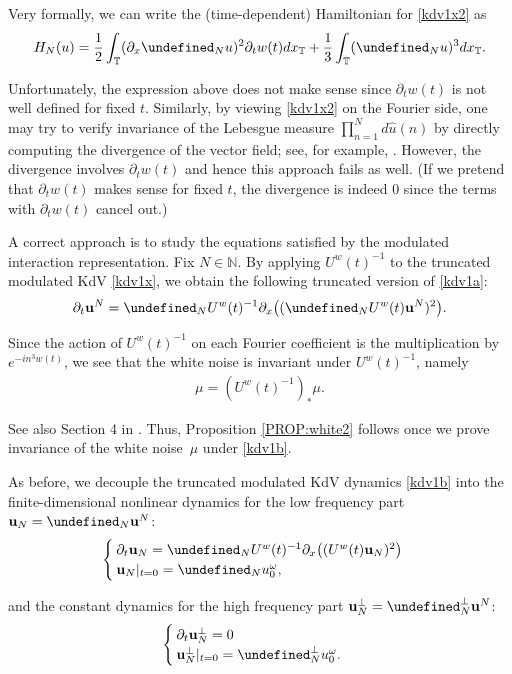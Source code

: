 \documentclass[letterpaper, 11pt,  reqno]{amsart}
\newcommand{\1}{\hspace{0.5mm}\text{I}\hspace{0.5mm}}
\newcommand{\noi}{\noindent}
\newcommand{\T}{\mathbb{T}}
\let\P= \undefined
\newcommand{\P}{\mathbf{P}}
\newcommand{\ft}{\widehat}
\newcommand{\dx}{\partial_x}
\newcommand{\dt}{\partial_t}
\renewcommand{\o}{\omega}
\newcommand{\N}{\mathbb{N}}
\newcommand{\uw}{U^w}
\newcommand{\uu}{\mathbf{u}}
\numberwithin{equation}{section}
\numberwithin{theorem}{section}
\begin{document}
Very formally, we can write the (time-dependent) Hamiltonian for \eqref{kdv1x2}
as 
\begin{align*}
H_N(u) = \frac 12 \int_\T (\dx \P_N u)^2\dt w (t) dx_\T
+ \frac 13 \int_\T (\P_N u)^3dx_\T.
\end{align*}

\noi
Unfortunately, the expression above does not make sense
since $\dt w (t)$ is not well defined for fixed $t$. 
Similarly, by viewing \eqref{kdv1x2} on the Fourier side, 
one may try to verify invariance of the Lebesgue measure
$\prod_{n = 1}^N d\ft u(n)$ by directly computing
the divergence of the vector field; see, for example, 
\cite[Lemma 4.1]{NORS}.
However, the divergence involves $\dt w(t)$
and hence this approach fails as well.
(If we pretend that $\dt w(t)$ makes sense for fixed $t$, 
the divergence is indeed $0$ since the terms
with $\dt w(t)$ cancel out.)


A correct approach is to study the equations satisfied
by the modulated interaction representation.
Fix  $N \in \N$.
By 
applying $\uw(t)^{-1}$ to the truncated modulated KdV \eqref{kdv1x}, 
we obtain the following 
 truncated version of \eqref{kdv1a}:
\begin{align}
\dt \uu^N = \P_N\uw(t)^{-1} \dx\big( (\P_N \uw(t) \uu^N)^2\big).
\label{kdv1b}
\end{align}


\noi
Since the action of $\uw(t)^{-1}$ on each Fourier coefficient
is the multiplication by $e^{-in^3 w(t)}$, 
we see that the white noise is invariant under $\uw(t)^{-1}$, 
namely
\begin{align*}
\mu = (\uw(t)^{-1})_* \mu.
\end{align*}

\noi
See also Section 4 in \cite{OTz}.
Thus, Proposition \ref{PROP:white2}
follows once we prove invariance of the white noise~$\mu$
under \eqref{kdv1b}.




As before, we decouple the truncated modulated KdV dynamics \eqref{kdv1b}
 into
 the finite-dimensional nonlinear dynamics for the low frequency part
  $\uu_N = \P_{N} \uu^N$:
\begin{align}
\begin{cases}
\dt \uu_N = \P_N\uw(t)^{-1} \dx\big( ( \uw(t) \uu_N)^2\big)\\
\uu_N|_{t = 0} = \P_{N} u_0^\o, 
\end{cases}
\label{kdv1d}
\end{align}

\noi
and the constant  dynamics for the high frequency part 
$\uu_N^\perp = \P_N^\perp \uu^N$:
\begin{align}
\begin{cases}
\dt \uu_N^\perp = 0\\
\uu_N^\perp |_{t = 0} = \P_{N}^\perp u_0^\o.
\end{cases}
\label{kdv1e}
\end{align}
\end{document}

